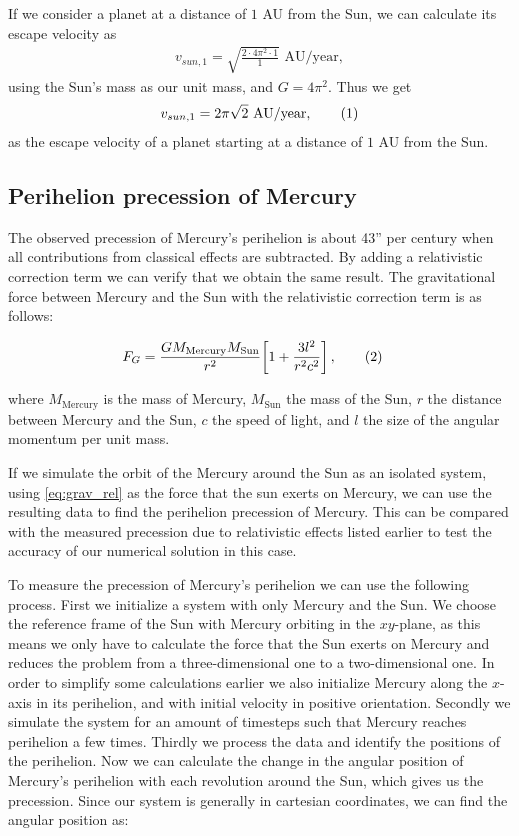 \documentclass[reprint,english,notitlepage]{revtex4-1}  %
\newcommand\numberthis{\addtocounter{equation}{1}\tag{\theequation}}
\begin{document}
If we consider a planet at a distance of \(1\) AU from the Sun, we can calculate its escape velocity as
\begin{align*}
	v_{sun, 1} = \sqrt{\frac{2\cdot 4\pi^{2}\cdot 1}{1}} \text{ AU/year},
\end{align*}
using the Sun's mass as our unit mass, and \(G = 4\pi^{2}\). Thus we get
\begin{align*}
	v_{sun, 1} = 2\pi\sqrt{2}\text{ AU/year}, \numberthis \label{eq:esc_sun_1au}
\end{align*}
as the escape velocity of a planet starting at a distance of \(1\) AU from the Sun.

\subsection{Perihelion precession of Mercury} \label{sec:II:f}

The observed precession of Mercury's perihelion is about 43'' per century when all contributions from classical effects are subtracted. By adding a relativistic correction term we can verify that we obtain the same result. The gravitational force between Mercury and the Sun with the relativistic correction term is as follows:

\begin{align*}
F_G &= \frac{GM_\text{Mercury} M_\text{Sun}}{r^2} \bigg[ 1 + \frac{3l^2}{r^2 c^2}\bigg] \, , \numberthis \label{eq:grav_rel} 
\end{align*}

where $M_\text{Mercury}$ is the mass of Mercury, $M_\text{Sun}$ the mass of the Sun, $r$ the distance between Mercury and the Sun, $c$ the speed of light, and $l$ the size of the angular momentum per unit mass. 

If we simulate the orbit of the Mercury around the Sun as an isolated system, using \eqref{eq:grav_rel} as the force that the sun exerts on Mercury, we can use the resulting data to find the perihelion precession of Mercury. This can be compared with the measured precession due to relativistic effects listed earlier to test the accuracy of our numerical solution in this case. 

To measure the precession of Mercury's perihelion we can use the following process. First we initialize a system with only Mercury and the Sun. We choose the reference frame of the Sun with Mercury orbiting in the $xy$-plane, as this means we only have to calculate the force that the Sun exerts on Mercury and reduces the problem from a three-dimensional one to a two-dimensional one. In order to simplify some calculations earlier we also initialize Mercury along the $x$-axis in its perihelion, and with initial velocity in positive orientation. Secondly we simulate the system for an amount of timesteps such that Mercury reaches perihelion a few times. Thirdly we process the data and identify the positions of the perihelion. Now we can calculate the change in the angular position of Mercury's perihelion with each revolution around the Sun, which gives us the precession. Since our system is generally in cartesian coordinates, we can find the angular position as:
\end{document}
